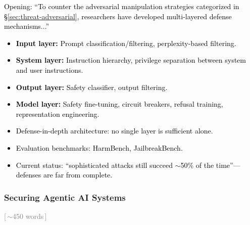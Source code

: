\documentclass[preprint,12pt]{elsarticle}
\newcommand{\wordcount}[1]{\hfill\textcolor{gray}{\small[\,#1\,]}}
\newcommand{\outline}[1]{\textcolor{black}{#1}}
\begin{document}
\outline{%
Opening: ``To counter the adversarial manipulation strategies categorized in \S\ref{sec:threat-adversarial}, researchers have developed multi-layered defense mechanisms...''
\begin{itemize}[nosep,leftmargin=1.5em]
    \item \textbf{Input layer:} Prompt classification/filtering, perplexity-based filtering.
    \item \textbf{System layer:} Instruction hierarchy, privilege separation between system and user instructions.
    \item \textbf{Output layer:} Safety classifier, output filtering.
    \item \textbf{Model layer:} Safety fine-tuning, circuit breakers, refusal training, representation engineering.
    \item Defense-in-depth architecture: no single layer is sufficient alone.
    \item Evaluation benchmarks: HarmBench, JailbreakBench.
    \item Current status: ``sophisticated attacks still succeed $\sim$50\% of the time''---defenses are far from complete.
\end{itemize}
}

\subsubsection{Securing Agentic AI Systems} \wordcount{$\sim$450 words}
\end{document}
